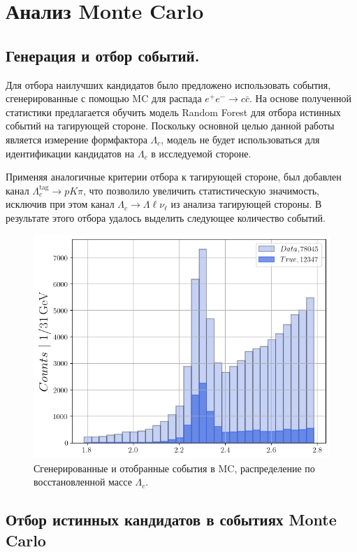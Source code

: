 \section{Анализ Monte Carlo}

\subsection*{Генерация и отбор событий.}

Для отбора наилучших кандидатов было предложено использовать события, сгенерированные с помощью MC для распада $e^+e^- \to c\bar{c}$. На основе полученной статистики предлагается обучить модель Random Forest для отбора истинных событий на тагирующей стороне. Поскольку основной целью данной работы является измерение формфактора $\Lambda_c$, модель не будет использоваться для идентификации кандидатов на $\Lambda_c$ в исследуемой стороне.

Применяя аналогичные критерии отбора к тагирующей стороне, был добавлен канал $\Lambda_c^{\text{tag}} \to p K \pi$, что позволило увеличить статистическую значимость, исключив при этом канал $\Lambda_c \to \Lambda \ell \nu_\ell$ из анализа тагирующей стороны. В результате этого отбора удалось выделить следующее количество событий.

\begin{figure}[H]
    \centering
    \includegraphics[width=0.7\linewidth]{img/mc_tr.png}
    \caption{Сгенерированные и отобранные события в MC, распределение по восстановленной массе $\Lambda_c$.}
\end{figure}


\subsection{Отбор истинных кандидатов в событиях Monte Carlo}


